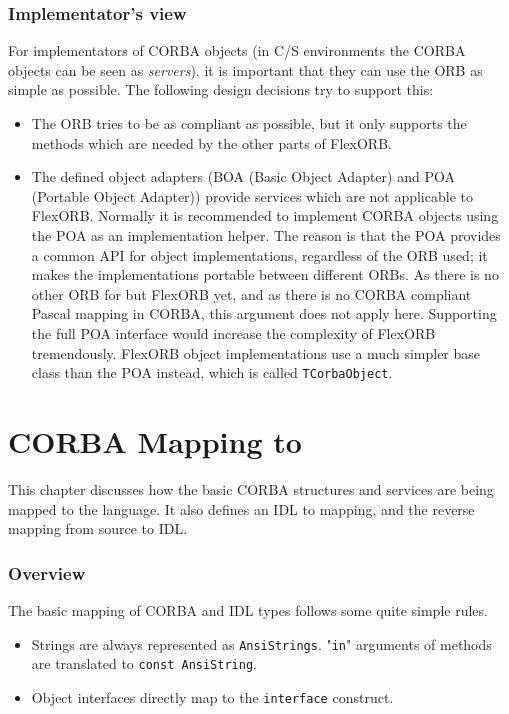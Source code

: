 \documentclass{report}
\begin{document}
\subsection{Implementator's view}
For implementators of CORBA objects (in C/S environments the CORBA
objects can be seen as \textit{servers}). it is important that they can use the ORB
as simple as possible. The following design decisions try to support this:
\begin{itemize}
\item The ORB tries to be as compliant as possible, but it only supports the
      methods which are needed by the other parts of FlexORB.
\item The defined object adapters (BOA (Basic Object Adapter) and POA (Portable
      Object Adapter)) provide services which are not applicable to FlexORB.
      Normally it is recommended to implement CORBA objects using the POA as
      an implementation helper. The reason is that the POA provides a common
      API for object implementations, regardless of the ORB used; it makes the
      implementations portable between different ORBs. As there is no other
      ORB for \fpc but FlexORB yet, and as there is no CORBA compliant
      Pascal mapping in CORBA, this argument does not apply here. Supporting
      the full POA interface would increase the complexity of FlexORB
      tremendously.
      \newline FlexORB object implementations use a much simpler base class
      than the POA instead, which is called \texttt{TCorbaObject}.
\end{itemize}

\chapter{CORBA Mapping to \fpc}
\label{ChapterMapping}

This chapter discusses how the basic CORBA structures and services are being
mapped to the \fpc language. It also defines an IDL to \fpc mapping, and the
reverse mapping from \fpc source to IDL.


\subsection{Overview}
The basic mapping of CORBA and IDL types follows some quite simple rules. 
\begin{itemize}
\item Strings are always represented as \texttt{AnsiStrings}. "\texttt{in}"
      arguments of methods are translated to \texttt{const AnsiString}.
\item Object interfaces directly map to the \fpc \texttt{interface} construct.
\end{itemize}
\end{document}
